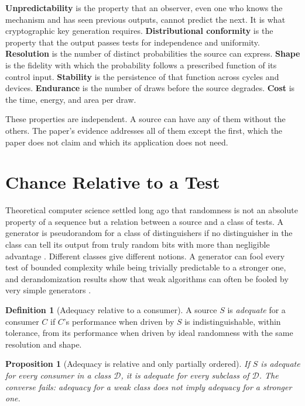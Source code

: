 \documentclass[11pt]{article}
\newtheorem{proposition}{Proposition}
\theoremstyle{definition}
\newtheorem{definition}{Definition}
\theoremstyle{remark}
\begin{document}
\textbf{Unpredictability} is the property that an observer, even one who knows the mechanism and has seen previous outputs, cannot predict the next. It is what cryptographic key generation requires. \textbf{Distributional conformity} is the property that the output passes tests for independence and uniformity. \textbf{Resolution} is the number of distinct probabilities the source can express. \textbf{Shape} is the fidelity with which the probability follows a prescribed function of its control input. \textbf{Stability} is the persistence of that function across cycles and devices. \textbf{Endurance} is the number of draws before the source degrades. \textbf{Cost} is the time, energy, and area per draw.

These properties are independent. A source can have any of them without the others. The paper's evidence addresses all of them except the first, which the paper does not claim and which its application does not need.

\section{Chance Relative to a Test}

Theoretical computer science settled long ago that randomness is not an absolute property of a sequence but a relation between a source and a class of tests. A generator is pseudorandom for a class of distinguishers if no distinguisher in the class can tell its output from truly random bits with more than negligible advantage \cite{yao1982,blum1984}. Different classes give different notions. A generator can fool every test of bounded complexity while being trivially predictable to a stronger one, and derandomization results show that weak algorithms can often be fooled by very simple generators \cite{nisan1994}.

\begin{definition}[Adequacy relative to a consumer]
A source $S$ is \emph{adequate} for a consumer $C$ if $C$'s performance when driven by $S$ is indistinguishable, within tolerance, from its performance when driven by ideal randomness with the same resolution and shape.
\end{definition}

\begin{proposition}[Adequacy is relative and only partially ordered]
If $S$ is adequate for every consumer in a class $\mathcal{D}$, it is adequate for every subclass of $\mathcal{D}$. The converse fails: adequacy for a weak class does not imply adequacy for a stronger one.
\end{proposition}
\end{document}
